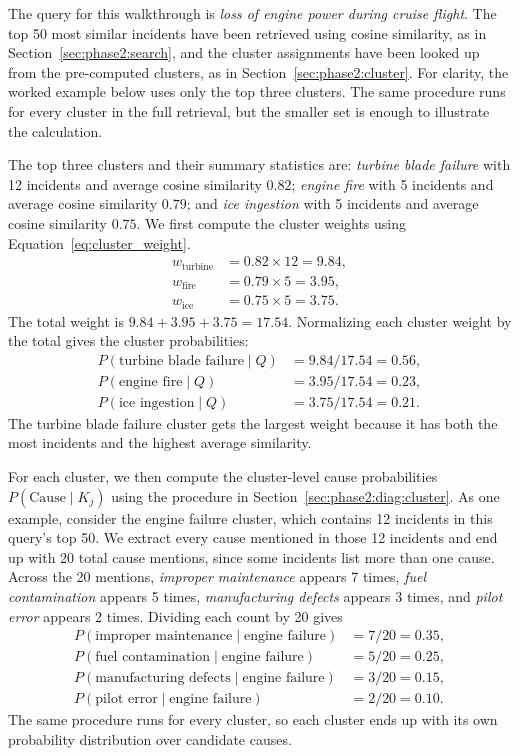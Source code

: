 \documentclass[11pt]{article}
\begin{document}
The query for this walkthrough is \emph{loss of engine power during cruise flight}. The top 50 most similar incidents have been retrieved using cosine similarity, as in Section~\ref{sec:phase2:search}, and the cluster assignments have been looked up from the pre-computed clusters, as in Section~\ref{sec:phase2:cluster}. For clarity, the worked example below uses only the top three clusters. The same procedure runs for every cluster in the full retrieval, but the smaller set is enough to illustrate the calculation.

The top three clusters and their summary statistics are: \emph{turbine blade failure} with 12 incidents and average cosine similarity $0.82$; \emph{engine fire} with 5 incidents and average cosine similarity $0.79$; and \emph{ice ingestion} with 5 incidents and average cosine similarity $0.75$. We first compute the cluster weights using Equation~\ref{eq:cluster_weight}.
\begin{align*}
w_{\text{turbine}} &= 0.82 \times 12 = 9.84, \\
w_{\text{fire}} &= 0.79 \times 5 = 3.95, \\
w_{\text{ice}} &= 0.75 \times 5 = 3.75.
\end{align*}
The total weight is $9.84 + 3.95 + 3.75 = 17.54$. Normalizing each cluster weight by the total gives the cluster probabilities:
\begin{align*}
P(\text{turbine blade failure} \mid Q) &= 9.84 / 17.54 = 0.56, \\
P(\text{engine fire} \mid Q) &= 3.95 / 17.54 = 0.23, \\
P(\text{ice ingestion} \mid Q) &= 3.75 / 17.54 = 0.21.
\end{align*}
The turbine blade failure cluster gets the largest weight because it has both the most incidents and the highest average similarity.

For each cluster, we then compute the cluster-level cause probabilities $P(\text{Cause} \mid K_j)$ using the procedure in Section~\ref{sec:phase2:diag:cluster}. As one example, consider the engine failure cluster, which contains 12 incidents in this query's top 50. We extract every cause mentioned in those 12 incidents and end up with 20 total cause mentions, since some incidents list more than one cause. Across the 20 mentions, \emph{improper maintenance} appears 7 times, \emph{fuel contamination} appears 5 times, \emph{manufacturing defects} appears 3 times, and \emph{pilot error} appears 2 times. Dividing each count by 20 gives
\begin{align*}
P(\text{improper maintenance} \mid \text{engine failure}) &= 7/20 = 0.35, \\
P(\text{fuel contamination} \mid \text{engine failure}) &= 5/20 = 0.25, \\
P(\text{manufacturing defects} \mid \text{engine failure}) &= 3/20 = 0.15, \\
P(\text{pilot error} \mid \text{engine failure}) &= 2/20 = 0.10.
\end{align*}
The same procedure runs for every cluster, so each cluster ends up with its own probability distribution over candidate causes.
\end{document}
